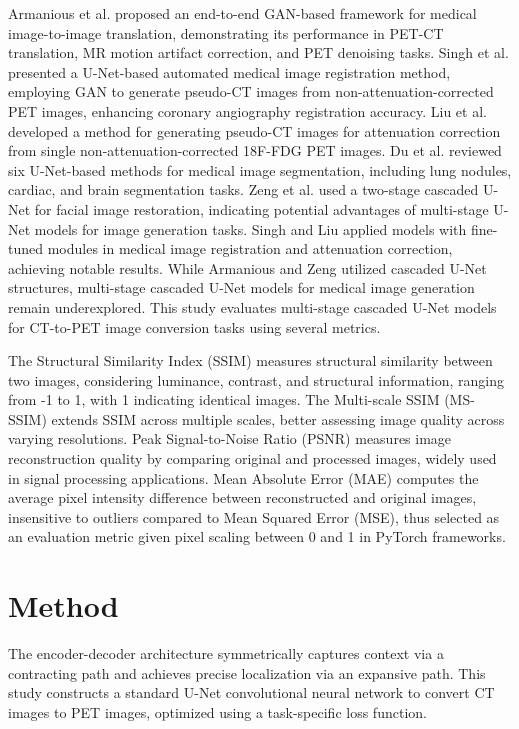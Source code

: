 \documentclass[a4paper, times, 10pt,twocolumn]{article}
\begin{document}
Armanious et al. \cite{armanious_medgan_2020} proposed an end-to-end GAN-based framework for medical image-to-image translation, demonstrating its performance in PET-CT translation, MR motion artifact correction, and PET denoising tasks. Singh et al. \cite{singh_automated_2023} presented a U-Net-based automated medical image registration method, employing GAN to generate pseudo-CT images from non-attenuation-corrected PET images, enhancing coronary angiography registration accuracy. Liu et al. \cite{liu_deep_2018} developed a method for generating pseudo-CT images for attenuation correction from single non-attenuation-corrected 18F-FDG PET images. Du et al. \cite{du_medical_2020} reviewed six U-Net-based methods for medical image segmentation, including lung nodules, cardiac, and brain segmentation tasks. Zeng et al. \cite{zeng_swin-casunet_2022} used a two-stage cascaded U-Net for facial image restoration, indicating potential advantages of multi-stage U-Net models for image generation tasks. Singh and Liu applied models with fine-tuned modules in medical image registration and attenuation correction, achieving notable results. While Armanious and Zeng utilized cascaded U-Net structures, multi-stage cascaded U-Net models for medical image generation remain underexplored. This study evaluates multi-stage cascaded U-Net models for CT-to-PET image conversion tasks using several metrics.

The Structural Similarity Index \cite{zhou_wang_image_2004} (SSIM) measures structural similarity between two images, considering luminance, contrast, and structural information, ranging from -1 to 1, with 1 indicating identical images. The Multi-scale SSIM (MS-SSIM) extends SSIM across multiple scales, better assessing image quality across varying resolutions. Peak Signal-to-Noise Ratio \cite{hore_image_2010} (PSNR) measures image reconstruction quality by comparing original and processed images, widely used in signal processing applications. Mean Absolute Error\cite{chai_root_2014} (MAE) computes the average pixel intensity difference between reconstructed and original images, insensitive to outliers compared to Mean Squared Error (MSE), thus selected as an evaluation metric given pixel scaling between 0 and 1 in PyTorch frameworks.


\section{Method}
The encoder-decoder architecture symmetrically captures context via a contracting path and achieves precise localization via an expansive path. This study constructs a standard U-Net convolutional neural network to convert CT images to PET images, optimized using a task-specific loss function.
\end{document}
